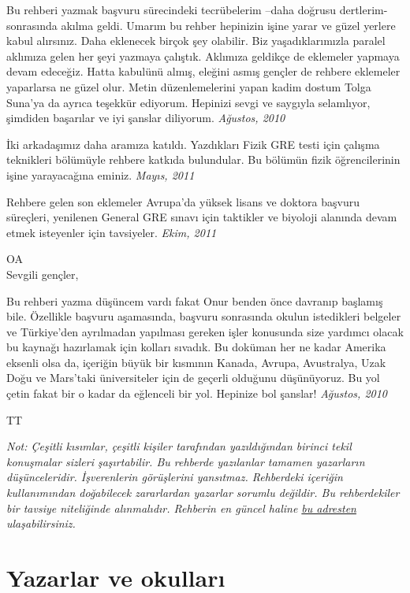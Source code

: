 \documentclass[12pt]{article}
\theoremstyle{break}
\begin{document}
Bu rehberi yazmak başvuru sürecindeki tecrübelerim –daha doğrusu dertlerim- sonrasında akılma geldi. Umarım bu rehber hepinizin işine yarar ve güzel yerlere kabul alırsınız. Daha eklenecek birçok şey olabilir. Biz yaşadıklarımızla paralel aklımıza gelen her şeyi yazmaya çalıştık. Aklımıza geldikçe de eklemeler yapmaya devam edeceğiz. Hatta kabulünü almış, eleğini asmış gençler de rehbere eklemeler yaparlarsa ne güzel olur. Metin düzenlemelerini yapan kadim dostum Tolga Suna’ya da ayrıca teşekkür ediyorum. Hepinizi sevgi ve saygıyla selamlıyor, şimdiden başarılar ve iyi şanslar diliyorum. \textit{Ağustos, 2010}

İki arkadaşımız daha aramıza katıldı. Yazdıkları Fizik GRE testi için çalışma teknikleri bölümüyle rehbere katkıda bulundular. Bu bölümün fizik öğrencilerinin işine yarayacağına eminiz. \textit{Mayıs, 2011}

Rehbere gelen son eklemeler Avrupa'da yüksek lisans ve doktora başvuru süreçleri, yenilenen General GRE sınavı için taktikler ve biyoloji alanında devam etmek isteyenler için tavsiyeler. \textit{Ekim, 2011}


\noindent OA \\


\noindent Sevgili gençler, 

Bu rehberi yazma düşüncem vardı fakat Onur benden önce davranıp başlamış bile. Özellikle başvuru aşamasında, başvuru sonrasında okulun istedikleri belgeler ve Türkiye’den ayrılmadan yapılması gereken işler konusunda size yardımcı olacak bu kaynağı hazırlamak için kolları sıvadık. Bu doküman her ne kadar Amerika eksenli olsa da, içeriğin büyük bir kısmının Kanada, Avrupa, Avustralya, Uzak Doğu ve Mars’taki üniversiteler için de geçerli olduğunu düşünüyoruz. Bu yol çetin fakat bir o kadar da eğlenceli bir yol. Hepinize bol şanslar! \textit{Ağustos, 2010}

\noindent TT  

\textit{Not: Çeşitli kısımlar, çeşitli kişiler tarafından yazıldığından birinci tekil konuşmalar sizleri şaşırtabilir. Bu rehberde yazılanlar tamamen yazarların düşünceleridir. İşverenlerin görüşlerini yansıtmaz. Rehberdeki içeriğin kullanımından doğabilecek zararlardan yazarlar sorumlu değildir. Bu rehberdekiler bir tavsiye niteliğinde alınmalıdır.
Rehberin en güncel haline \href{https://github.com/yurtdisiphdrehberi/yurtdisiphdrehberi/}{bu adresten} ulaşabilirsiniz.}

\newpage
%
%
%
\section*{Yazarlar ve okulları}
\end{document}
